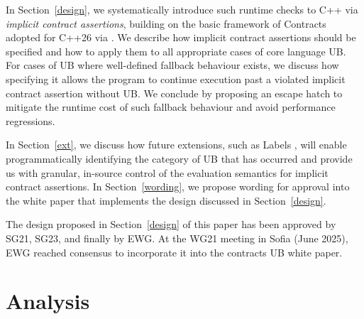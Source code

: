 In Section~\ref{design}, we systematically introduce such runtime checks to C++ via  \emph{implicit contract assertions}, building on the basic framework of Contracts adopted for C++26 via \cite{P2900R14}. We describe how implicit contract assertions should be specified and how to apply them to all appropriate cases of core language UB. For cases of UB where well-defined fallback behaviour exists, we discuss how specifying it allows the program to continue execution past a violated implicit contract assertion without UB. We conclude by proposing an escape hatch to mitigate the runtime cost of such fallback behaviour and avoid performance regressions.

In Section~\ref{ext}, we discuss how future extensions, such as Labels \cite{P3400R1},
will enable programmatically identifying the category of UB that has occurred and provide us with granular, in-source control of the evaluation semantics for implicit contract assertions. In Section~\ref{wording}, we propose wording for approval into the white paper that implements the design discussed in Section~\ref{design}.

The design proposed in Section~\ref{design} of this paper has been approved by SG21, SG23, and finally by EWG. At the WG21 meeting in Sofia (June 2025), EWG reached consensus to incorporate it into the contracts UB white paper.

\section{Analysis}
\label{ub}



